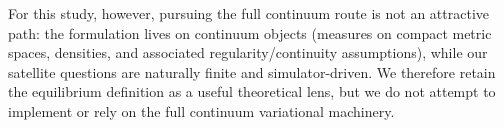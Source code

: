 For this study, however, pursuing the full continuum route is not an attractive path: the formulation lives on
continuum objects (measures on compact metric spaces, densities, and associated regularity/continuity assumptions), while
our satellite questions are naturally finite and simulator-driven. We therefore retain the equilibrium definition as a
useful theoretical lens, but we do not attempt to implement or rely on the full continuum variational machinery.



